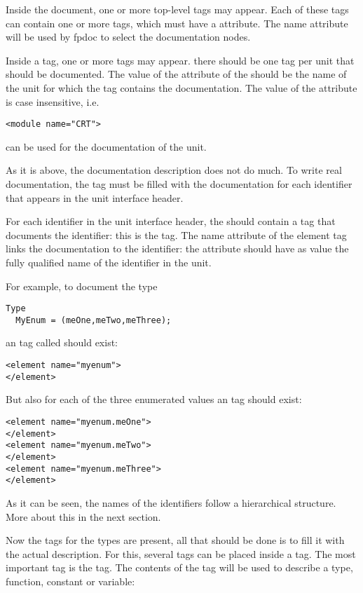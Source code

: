 Inside the document, one or more top-level  
tags may appear. Each of these tags can contain one or more 
tags, which must have a  attribute. The name attribute will be
used by fpdoc to select the documentation nodes.

Inside a  tag, one or more  tags may appear. there
should be one  tag per unit that should be documented. The value
of the  attribute of the  should be the name of the
unit for which the  tag contains the documentation. The value
of the  attribute is case insensitive, i.e. 
\begin{verbatim}
<module name="CRT">
\end{verbatim}
can be used for the documentation of the  unit.

As it is above, the documentation description does not do much. To write
real documentation, the  tag must be filled with the
documentation for each identifier that appears in the unit interface header.

For each identifier in the unit interface header, the  should
contain a tag that documents the identifier: this is the  tag.
The name attribute of the element tag links the documentation to the
identifier: the  attribute should have as value the fully
qualified name of the identifier in the unit.

For example, to document the type
\begin{verbatim}
Type
  MyEnum = (meOne,meTwo,meThree);
\end{verbatim}
an  tag called  should exist:
\begin{verbatim}
<element name="myenum">
</element>
\end{verbatim}
But also for each of the three enumerated values an  tag should 
exist:
\begin{verbatim}
<element name="myenum.meOne">
</element>
<element name="myenum.meTwo">
</element>
<element name="myenum.meThree">
</element>
\end{verbatim}
As it can be seen, the names of the identifiers follow a hierarchical
structure. More about this in the next section.

Now the tags for the types are present, all that should be done is to fill
it with the actual description.  For this, several tags can be placed inside
a  tag. The most important tag is the  tag. The
contents of the  tag will be used to describe a type, function, 
constant or variable:

